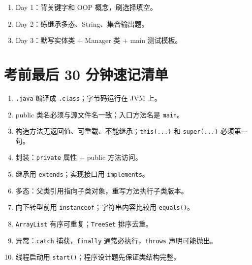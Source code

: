\documentclass[UTF8,zihao=-4]{ctexart}
\begin{document}
\begin{methodbox}[3 天版]
\begin{enumerate}
  \item Day 1：背关键字和 OOP 概念，刷选择填空。
  \item Day 2：练继承多态、String、集合输出题。
  \item Day 3：默写实体类 + Manager 类 + main 测试模板。
\end{enumerate}
\end{methodbox}

\section{考前最后 30 分钟速记清单}
\begin{keybox}[只看这些]
\begin{enumerate}
  \item \texttt{.java} 编译成 \texttt{.class}；字节码运行在 JVM 上。
  \item public 类名必须与源文件名一致；入口方法名是 \texttt{main}。
  \item 构造方法无返回值、可重载、不能继承；\texttt{this(...)} 和 \texttt{super(...)} 必须第一句。
  \item 封装：\texttt{private} 属性 + public 方法访问。
  \item 继承用 \texttt{extends}；实现接口用 \texttt{implements}。
  \item 多态：父类引用指向子类对象，重写方法执行子类版本。
  \item 向下转型前用 \texttt{instanceof}；字符串内容比较用 \texttt{equals()}。
  \item \texttt{ArrayList} 有序可重复；\texttt{TreeSet} 排序去重。
  \item 异常：\texttt{catch} 捕获，\texttt{finally} 通常必执行，\texttt{throws} 声明可能抛出。
  \item 线程启动用 \texttt{start()}；程序设计题先保证类结构完整。
\end{enumerate}
\end{keybox}
\end{document}
